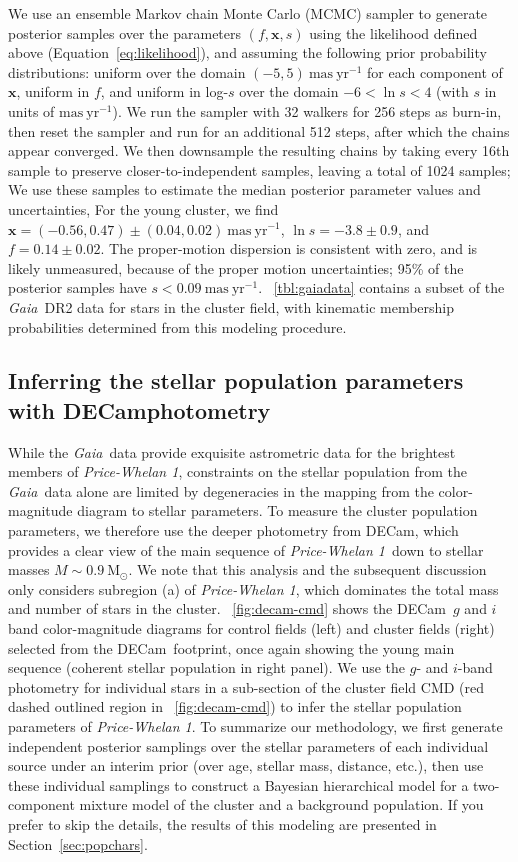 \documentclass[twocolumn]{aastex62}
\newcommand{\acronym}[1]{{\small{#1}}}
\newcommand{\gaia}{\textsl{Gaia}}
\newcommand{\decam}{DECam}
\newcommand{\DR}[1]{\acronym{DR#1}}
\newcommand{\bs}[1]{\boldsymbol{#1}}
\newcommand{\sectionname}{Section}
\newcommand{\equationname}{Equation}
\newcommand{\msun}{\textrm{M}_\odot}
\newcommand{\masyr}{\ensuremath{\textrm{mas}~\textrm{yr}^{-1}}}
\newcommand{\clustername}{\textsl{Price-Whelan 1}}
\begin{document}
We use an ensemble Markov chain Monte Carlo (MCMC) sampler \citep[\texttt{emcee};][]{emcee, Goodman:2010} to generate posterior samples over the parameters $(f, \bs{x}, s)$ using the likelihood defined above (\equationname~\ref{eq:likelihood}), and assuming the following prior probability distributions: uniform over the domain $(-5, 5)~\masyr$ for each component of $\bs{x}$, uniform in $f$, and uniform in log-$s$ over the domain $-6 < \ln s < 4$ (with $s$ in units of \masyr).
We run the sampler with 32 walkers for 256 steps as burn-in, then reset the sampler and run for an additional 512 steps, after which the chains appear converged.
We then downsample the resulting chains by taking every 16th sample to preserve closer-to-independent samples, leaving a total of 1024 samples; We use these samples to estimate the median posterior parameter values and uncertainties,
For the young cluster, we find $\bs{x} = (-0.56,  0.47) \pm (0.04, 0.02)~\masyr$, $\ln s = -3.8 \pm 0.9$, and $f = 0.14 \pm 0.02$.
The proper-motion dispersion is consistent with zero, and is likely unmeasured, because of the proper motion uncertainties; 95\% of the posterior samples have $s < 0.09~\masyr$.
\tablename~\ref{tbl:gaiadata} contains a subset of the \gaia\ \DR{2} data for stars in the cluster field, with kinematic membership probabilities determined from this modeling procedure.


\subsection{Inferring the stellar population parameters with \decam photometry}
\label{sec:popmodel}

While the \gaia\ data provide exquisite astrometric data for the brightest members of \clustername, constraints on the stellar population from the \gaia\ data alone are limited by degeneracies in the mapping from the color-magnitude diagram to stellar parameters.
To measure the cluster population parameters, we therefore use the deeper photometry from \decam, which provides a clear view of the main sequence of \clustername\ down to stellar masses $M \sim 0.9~\msun$.
We note that this analysis and the subsequent discussion only considers subregion (a) of \clustername, which dominates the total mass and number of stars in the cluster.
\figurename~\ref{fig:decam-cmd} shows the \decam\ $g$ and $i$ band color-magnitude diagrams for control fields (left) and cluster fields (right) selected from the \decam\ footprint, once again showing the young main sequence (coherent stellar population in right panel).
We use the $g$- and $i$-band photometry for individual stars in a sub-section of the cluster field CMD (red dashed outlined region in \figurename~\ref{fig:decam-cmd}) to infer the stellar population parameters of \clustername.
To summarize our methodology, we first generate independent posterior samplings over the stellar parameters of each individual source under an interim prior (over age, stellar mass, distance, etc.), then use these individual samplings to construct a Bayesian hierarchical model for a two-component mixture model of the cluster and a background population.
If you prefer to skip the details, the results of this modeling are presented in \sectionname~\ref{sec:popchars}.
\end{document}
